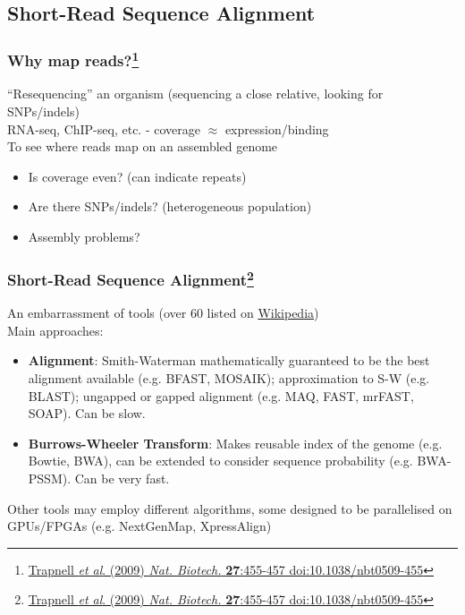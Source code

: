 
\subsection{Short-Read Sequence Alignment}

\begin{frame}
  \frametitle{Why map reads?\footnote{\tiny{\href{http://dx.doi.org/10.1038/nbt0509-455}{Trapnell \textit{et al}. (2009) \textit{Nat. Biotech.} \textbf{27}:455-457 doi:10.1038/nbt0509-455}}}}
  ``Resequencing'' an organism (sequencing a close relative, looking for SNPs/indels)\\[0.25cm]
  RNA-seq, ChIP-seq, etc. - coverage $\approx$ expression/binding\\[0.25cm]
  To see where reads map on an assembled genome\\
  \begin{itemize}
    \item Is coverage even? (can indicate repeats)
    \item Are there SNPs/indels? (heterogeneous population)
    \item Assembly problems?
  \end{itemize}  
\end{frame}

\begin{frame}
  \frametitle{Short-Read Sequence Alignment\footnote{\tiny{\href{http://dx.doi.org/10.1038/nbt0509-455}{Trapnell \textit{et al}. (2009) \textit{Nat. Biotech.} \textbf{27}:455-457 doi:10.1038/nbt0509-455}}}}
  An embarrassment of tools (over 60 listed on \href{http://en.wikipedia.org/wiki/List_of_sequence_alignment_software}{Wikipedia})\\
  Main approaches:
  \begin{itemize}
    \item \textbf{Alignment}: Smith-Waterman mathematically guaranteed to be the best alignment available (e.g. BFAST, MOSAIK);  approximation to S-W (e.g. BLAST); ungapped or gapped alignment (e.g. MAQ, FAST, mrFAST, SOAP). Can be slow.
    \item \textbf{Burrows-Wheeler Transform}: Makes reusable index of the genome (e.g. Bowtie, BWA), can be extended to consider sequence probability (e.g. BWA-PSSM). Can be very fast.
  \end{itemize}
  Other tools may employ different algorithms, some designed to be parallelised on GPUs/FPGAs (e.g. NextGenMap, XpressAlign)
\end{frame}

